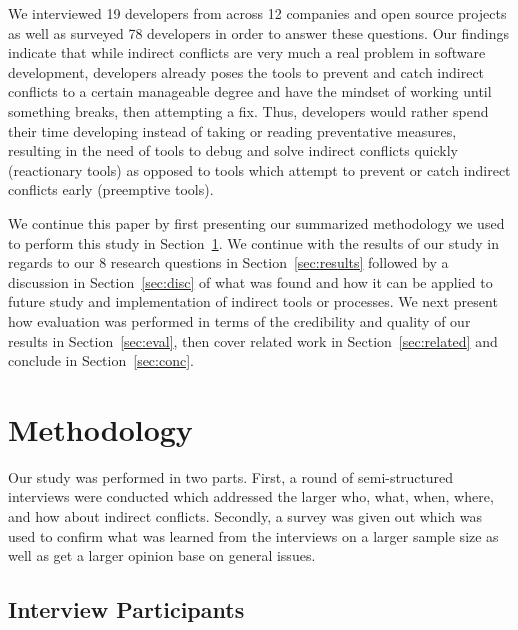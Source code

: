 \documentclass[conference]{IEEEtran}
\begin{document}
We interviewed 19 developers from across 12 companies and open source projects as well as surveyed 78 
developers in order to answer these questions. Our findings indicate that while indirect conflicts are very much a real problem
in software development, developers already poses the tools to prevent and catch indirect conflicts to a certain manageable degree and have
the mindset of working until something breaks, then attempting a fix. Thus, developers would rather spend their time developing instead
of taking or reading preventative measures, resulting in the need of tools to debug and solve indirect conflicts quickly
(reactionary tools) as opposed to tools which attempt to prevent or catch indirect conflicts early (preemptive tools).

We continue this paper by first presenting our summarized methodology we used to perform this study in Section~\ref{sec:meth}. We
continue with the results of our study in regards to our 8 research questions in Section~\ref{sec:results} 
followed by a discussion in Section~\ref{sec:disc} of what was found and how it can be applied to future study and implementation
of indirect tools or processes. We next present how evaluation was performed in terms of the credibility
and quality of our results in Section~\ref{sec:eval}, then cover related work in Section~\ref{sec:related}
and conclude in Section~\ref{sec:conc}.

\section{Methodology}
\label{sec:meth}

Our study was performed in two parts. First, a round of semi-structured interviews were conducted which 
addressed the larger who, what, when, where, and how about indirect conflicts. Secondly, a survey was given
out which was used to confirm what was learned from the interviews on a larger sample size as well as get
a larger opinion base on general issues.

\subsection{Interview Participants}
\end{document}
